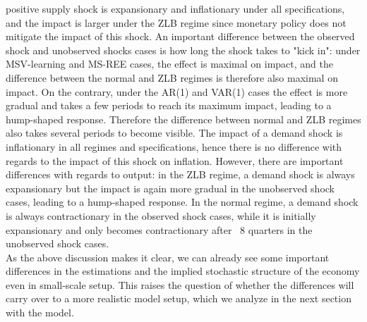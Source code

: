 \documentclass[12pt,reqno]{article}
\numberwithin{equation}{section}
\begin{document}
positive supply shock is expansionary and inflationary under all specifications, and the impact is larger under the ZLB regime since monetary policy does not mitigate the impact of this shock. An important difference between the observed shock and unobserved shocks cases is how long the shock takes to "kick in": under MSV-learning and MS-REE cases, the effect is maximal on impact, and the difference between the normal and ZLB regimes is therefore also maximal on impact. On the contrary, under the AR(1) and VAR(1) cases the effect is more gradual and takes a few periods to reach its maximum impact, leading to a hump-shaped response. Therefore the difference between normal and ZLB regimes also takes several periods to become visible. The impact of a demand shock is inflationary in all regimes and specifications, hence there is no difference with regards to the impact of this shock on inflation. However, there are important differences with regards to output: in the ZLB regime, a demand shock is always expansionary but the impact is again more gradual in the unobserved shock cases, leading to a hump-shaped response. In the normal regime, a demand shock is always contractionary in the observed shock cases, while it is initially expansionary and only becomes contractionary after ~8 quarters in the unobserved shock cases. \\
\noindent
As the above discussion makes it clear, we can already see some important differences in the estimations and the implied stochastic structure of the economy even in small-scale setup. This raises the question of whether the differences will carry over to a more realistic model setup, which we analyze in the next section with the \cite{smets2007shocks} model. 
\end{document}
